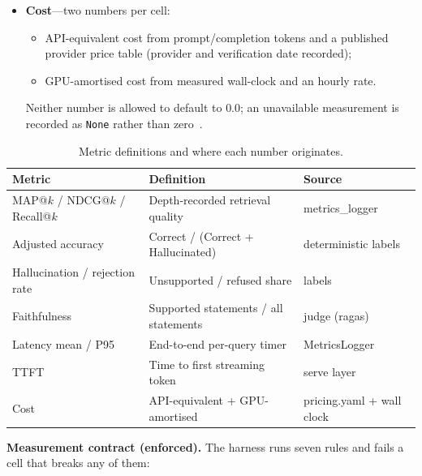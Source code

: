 \begin{itemize}
          per second. P95 tail matters because a few slow queries
          dominate user-visible latency in a served system.
    \item \textbf{Cost}---two numbers per cell:
          \begin{itemize}
              \item API-equivalent cost from prompt/completion tokens
                    and a published provider price table (provider and
                    verification date recorded);
              \item GPU-amortised cost from measured wall-clock and an
                    hourly rate.
          \end{itemize}
          Neither number is allowed to default to $0.0$; an unavailable
          measurement is recorded as \texttt{None} rather than zero~\cite{elkiran2026empirical}.
\end{itemize}

\begin{table}[h]
\centering
\caption{Metric definitions and where each number originates.}
\label{tab:metrics}
\begin{tabular}{lll}
\toprule
\textbf{Metric} & \textbf{Definition} & \textbf{Source} \\
\midrule
MAP@$k$ / NDCG@$k$ / Recall@$k$ & Depth-recorded retrieval quality & metrics\_logger \\
Adjusted accuracy & Correct / (Correct + Hallucinated) & deterministic labels \\
Hallucination / rejection rate & Unsupported / refused share & labels \\
Faithfulness & Supported statements / all statements & judge (ragas) \\
Latency mean / P95 & End-to-end per-query timer & MetricsLogger \\
TTFT & Time to first streaming token & serve layer \\
Cost & API-equivalent + GPU-amortised & pricing.yaml + wall clock \\
\bottomrule
\end{tabular}
\end{table}

\textbf{Measurement contract (enforced).}
The harness runs seven rules and fails a cell that breaks any of them:

